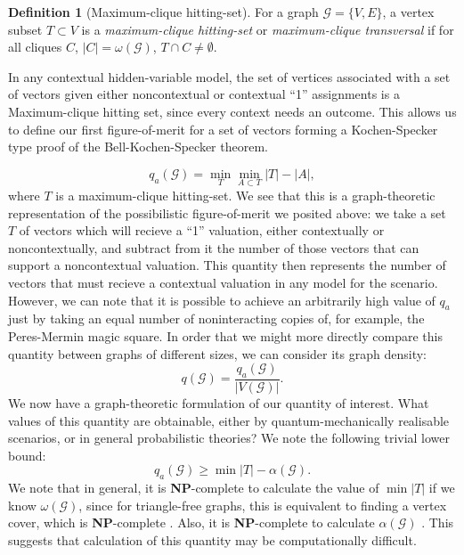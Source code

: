 \documentclass{amsart}
\theoremstyle{definition}
\newtheorem{defn}{Definition}
\begin{document}
\begin{defn}[Maximum-clique hitting-set]
For a graph $\mathcal{G}=\{V,E\}$, a vertex subset $T\subset V$ is a \emph{maximum-clique hitting-set} or \emph{maximum-clique transversal} if for all cliques $C$, $|C|=\omega(\mathcal{G})$, $T\cap C\neq\emptyset$.
\end{defn}

In any contextual hidden-variable model, the set of vertices associated with a set of vectors given either noncontextual or contextual ``1'' assignments is a Maximum-clique hitting set, since every context needs an outcome. This allows us to define our first figure-of-merit for a set of vectors forming a Kochen-Specker type proof of the Bell-Kochen-Specker theorem.

\begin{equation}q_a(\mathcal{G})=\min_T \min_{A\subset T} |T|-|A|,\end{equation}
where $T$ is a maximum-clique hitting-set. We see that this is a graph-theoretic representation of the possibilistic figure-of-merit we posited above: we take a set $T$ of vectors which will recieve a ``1'' valuation, either contextually or noncontextually, and subtract from it the number of those vectors that can support a noncontextual valuation. This quantity then represents the number of vectors that must recieve a contextual valuation in any model for the scenario. However, we can note that it is possible to achieve an arbitrarily high value of $q_a$ just by taking an equal number of noninteracting copies of, for example, the Peres-Mermin magic square. In order that we might more directly compare this quantity between graphs of different sizes, we can consider its graph density:
\begin{equation}
q(\mathcal{G})=\frac{q_a(\mathcal{G})}{|V(\mathcal{G})|}.
\end{equation}
We now have a graph-theoretic formulation of our quantity of interest. What values of this quantity are obtainable, either by quantum-mechanically realisable scenarios, or in general probabilistic theories? We note the following trivial lower bound:
\begin{equation}
q_a(\mathcal{G})\geq \min |T|-\alpha(\mathcal{G}).
\end{equation}
We note that in general, it is \textbf{NP}-complete to calculate the value of $\min |T|$ if we know $\omega(\mathcal{G})$, since for triangle-free graphs, this is equivalent to finding a vertex cover, which is \textbf{NP}-complete \cite{Polj1974}. Also, it is \textbf{NP}-complete to calculate $\alpha(\mathcal{G})$ \cite{Gare1979}. This suggests that calculation of this quantity may be computationally difficult.
\end{document}
